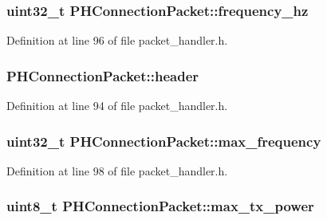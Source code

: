 \hypertarget{struct_p_h_connection_packet_a50a68f68b6f7f8d07f91f9076d638dbd}{
\subsubsection[{frequency\-\_\-hz}]{\setlength{\rightskip}{0pt plus 5cm}uint32\-\_\-t {\bf \-P\-H\-Connection\-Packet\-::frequency\-\_\-hz}}}\label{struct_p_h_connection_packet_a50a68f68b6f7f8d07f91f9076d638dbd}


\-Definition at line 96 of file packet\-\_\-handler.\-h.

\hypertarget{struct_p_h_connection_packet_a52261a934b08802064ddd177d22f5a1b}{
\subsubsection[{header}]{ {\bf \-P\-H\-Connection\-Packet\-::header}}}\label{struct_p_h_connection_packet_a52261a934b08802064ddd177d22f5a1b}


\-Definition at line 94 of file packet\-\_\-handler.\-h.

\hypertarget{struct_p_h_connection_packet_a607b2aff285e735c41dee293f8144be0}{
\subsubsection[{max\-\_\-frequency}]{\setlength{\rightskip}{0pt plus 5cm}uint32\-\_\-t {\bf \-P\-H\-Connection\-Packet\-::max\-\_\-frequency}}}\label{struct_p_h_connection_packet_a607b2aff285e735c41dee293f8144be0}


\-Definition at line 98 of file packet\-\_\-handler.\-h.

\hypertarget{struct_p_h_connection_packet_aaeff460e39a62242df16ffce090b0760}{
\subsubsection[{max\-\_\-tx\-\_\-power}]{\setlength{\rightskip}{0pt plus 5cm}uint8\-\_\-t {\bf \-P\-H\-Connection\-Packet\-::max\-\_\-tx\-\_\-power}}}\label{struct_p_h_connection_packet_aaeff460e39a62242df16ffce090b0760}



